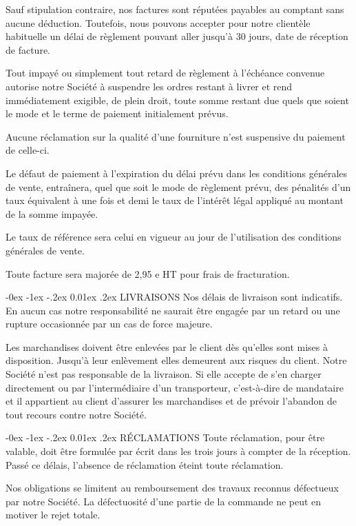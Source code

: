 \documentclass[a4paper, oneside, 10pt, french]{article}
\makeatletter
\renewcommand{\section}{\@startsection {section}{1}{\z@}%
             {-0ex \@plus -1ex \@minus -.2ex}%
             {0.01ex \@plus.2ex}%
             {\normalfont\normalsize\sffamily}}
\makeatother
\begin{document}
\begin{multicols}{2}
\begin{small}
Sauf stipulation contraire, nos factures sont réputées payables au comptant sans aucune déduction. Toutefois, nous pouvons accepter pour notre clientèle habituelle un délai de règlement pouvant aller jusqu’à 30 jours, date de réception de facture.

Tout impayé ou simplement tout retard de règlement à l’échéance convenue autorise notre Société à suspendre les ordres restant à livrer et rend immédiatement exigible, de plein droit, toute somme restant due quels que soient le mode et le terme de paiement initialement prévus.

Aucune réclamation sur la qualité d’une fourniture n’est suspensive du paiement de celle-ci.

Le défaut de paiement à l’expiration du délai prévu dans les conditions générales de vente, entraînera, quel que soit le mode de règlement prévu, des pénalités d’un taux équivalent à une fois et demi le taux de l’intérêt légal appliqué au montant de la somme impayée.

Le taux de référence sera celui en vigueur au jour de l’utilisation des conditions générales de vente.

Toute facture sera majorée de 2,95 e HT pour frais de fracturation.

\section{LIVRAISONS}
Nos délais de livraison sont indicatifs. En aucun cas notre responsabilité ne saurait être engagée par un retard ou une rupture occasionnée par un cas de force majeure.

Les marchandises doivent être enlevées par le client dès qu’elles sont mises à disposition. Jusqu’à leur enlèvement elles demeurent aux risques du client. Notre Société n’est pas responsable de la livraison. Si elle accepte de s’en charger directement ou par l’intermédiaire d’un transporteur, c’est-à-dire de mandataire et il appartient au client d’assurer les marchandises et de prévoir l’abandon de tout recours contre notre Société.

\section{RÉCLAMATIONS}
Toute réclamation, pour être valable, doit être formulée par écrit dans les trois jours à compter de la réception. Passé ce délais, l’absence de réclamation éteint toute réclamation.

Nos obligations se limitent au remboursement des travaux reconnus défectueux par notre Société. La défectuosité d’une partie de la commande ne peut en motiver le rejet totale.


\end{small}
\end{multicols}
\end{document}
